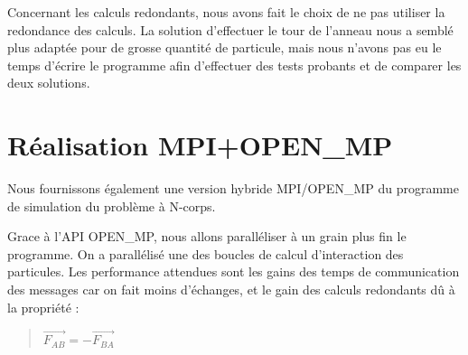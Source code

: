 \par Concernant les calculs redondants, nous avons fait le choix de ne pas utiliser la redondance 
des calculs. La solution d'effectuer le tour de l'anneau nous a semblé plus adaptée 
pour de grosse quantité de particule, mais nous n'avons pas eu le temps d'écrire le programme
afin d'effectuer des tests probants et de comparer les deux solutions.\\

\section{Réalisation MPI+OPEN\_MP}

\par Nous fournissons également une version hybride MPI/OPEN\_MP 
du programme de simulation du problème à N-corps.
\par Grace à l'API OPEN\_MP, nous allons paralléliser à un grain plus fin 
le programme. On a parallélisé une des boucles de calcul d'interaction
des particules. Les performance attendues sont les gains des temps de communication
des messages  car on fait moins d'échanges, et le gain des calculs redondants dû 
à la propriété :

\begin{quote}
  \begin{center}
    $ \overrightarrow{F_{AB}} = -\overrightarrow{F_{BA}} $
  \end{center}
\end{quote}
